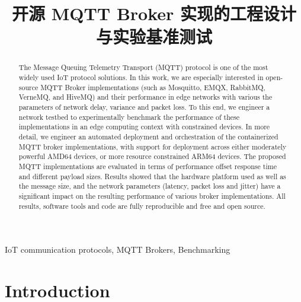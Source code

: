 \documentclass[conference]{IEEEtran}
\begin{document}
\title{开源 MQTT Broker 实现的工程设计与实验基准测试}



\author{
}

\maketitle

\begin{abstract}
    
    The Message Queuing Telemetry Transport (MQTT) protocol is one of the most widely used IoT protocol solutions. In this work, we are especially interested in open-source MQTT Broker
     implementations (such as Mosquitto, EMQX, RabbitMQ, VerneMQ, and HiveMQ) and their performance in edge networks with various  the parameters of network delay, variance and packet loss. To this end, we engineer a
    network testbed to experimentally benchmark the performance of these implementations in an edge
     computing context with constrained devices. In more detail, we engineer an automated deployment and
     orchestration of the containerized MQTT broker implementations, with support for deployment across
    either moderately powerful AMD64 devices, or more resource constrained ARM64 devices. The proposed
    MQTT implementations are evaluated in terms of performance offset response time and different payload sizes.
    Results showed that the hardware platform used as well as the message size, and the network parameters (latency, packet loss and jitter) have a significant impact on the resulting performance of various broker implementations. All results, software tools and code are fully reproducible and free and open source. 
    \end{abstract}
    

\begin{IEEEkeywords}
 IoT communication protocols, MQTT Brokers, Benchmarking
\end{IEEEkeywords}

\section{Introduction}
\end{document}
